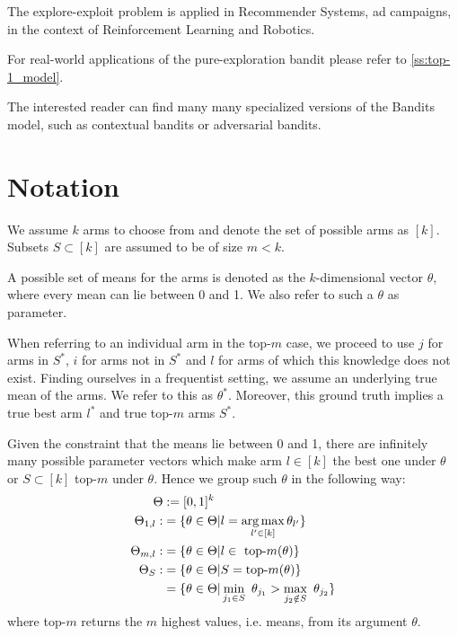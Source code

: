 The explore-exploit problem is applied in Recommender Systems, ad campaigns, in
the context of Reinforcement Learning and Robotics.

For real-world applications of the pure-exploration bandit please refer to
\ref{ss:top-1_model}.

The interested reader can find many many specialized versions of the Bandits
model, such as contextual bandits or adversarial bandits.

\section{Notation}\label{section:notation}
We assume $k$ arms to choose from and denote the set of possible arms as $[k]$.
Subsets $S \subset [k]$ are assumed to be of size $m < k$.

A possible set of means for the arms is denoted as the $k$-dimensional vector
$\theta$, where every mean can lie between 0 and 1. We also refer to such a
$\theta$ as parameter.

When referring to an individual arm in the top-$m$ case, we proceed to use $j$
for arms in $S^*$, $i$ for arms not in $S^*$ and $l$ for arms of which this
knowledge does not exist. Finding ourselves in a frequentist setting, we assume
an underlying true mean of the arms. We refer to this as $\theta^*$. Moreover,
this ground truth implies a true best arm $l^*$ and true top-$m$ arms $S^*$.

Given the constraint that the means lie between 0 and 1, there are infinitely
many possible parameter vectors which make arm $l \in [k]$ the best one under
$\theta$ or $S \subset [k]$ top-$m$ under $\theta$. Hence we group such $\theta$
in the following way:
\begin{align}
  \Theta &:= [0, 1]^k \\
  \Theta_{1, l} :&= \{\theta \in \Theta | l = \operatorname*{arg\,max}_{l' \in [k]}
      \theta_{l'}\} \\
  \Theta_{m, l} :&= \{\theta \in \Theta | l \in \text{ top-}m(\theta)\} \\
  \Theta_S :&= \{\theta \in \Theta | S = \text{top-}m(\theta)\} \\
    &= \{ \theta \in \Theta| \min_{j_1 \in S}\ \theta_{j_1} > \max_{j_2 \notin
      S}\ \theta_{j_2}\}
\end{align}
where top-$m$ returns the $m$ highest values, i.e. means, from its argument
$\theta$.

